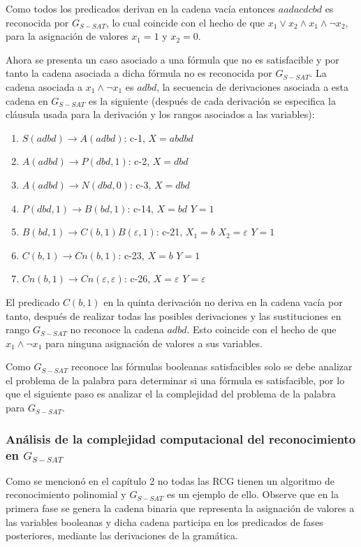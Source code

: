 \documentclass[12pt]{article}
\begin{document}
Como todos los predicados derivan en la cadena vacía entonces $aadacdcbd$ es reconocida por $G_{S-SAT}$, lo
cual coincide con el hecho de que $x_1 \vee  x_2 \wedge x_1 \wedge \neg x_2$, para la asignación de valores
$x_1=1$ y $x_2=0$.

Ahora se presenta un caso asociado a una fórmula que no es satisfacible y por tanto la cadena asociada a dicha
fórmula no es reconocida por $G_{S-SAT}$. La cadena asociada a $x_1  \wedge \neg x_1$ es $adbd$, la secuencia
de derivaciones asociada a esta cadena en $G_{S-SAT}$ es la siguiente  (después de
cada derivación se especifica la cláusula usada para la derivación y los rangos
asociados a las variables):

\begin{enumerate}
    \item $S(adbd)\to A(adbd)$: c-1, $X=abdbd$
    \item $A(adbd)\to P(dbd,1)$: c-2, $X=dbd$
    \item $A(adbd)\to N(dbd,0)$: c-3, $X=dbd$
    \item $P(dbd,1) \to B(bd,1)$: c-14, $X=bd$ $Y=1$
    \item $B(bd,1)\to C(b,1) B(\varepsilon,1)$: c-21, $X_1=b$ $X_2=\varepsilon$ $Y=1$
    \item $C(b,1)\to Cn(b,1)$: c-23, $X=b$ $Y=1$
    \item $Cn(b,1)\to Cn(\varepsilon,\varepsilon)$: c-26, $X=\varepsilon$ $Y=\varepsilon$
\end{enumerate}

El predicado $C(b,1)$ en la quinta derivación no deriva en la cadena vacía por tanto, después de realizar todas las
posibles derivaciones y las sustituciones en rango $G_{S-SAT}$ no reconoce la cadena $adbd$. Esto coincide con el hecho de
que $x_1  \wedge \neg x_1$ para ninguna asignación de valores a sus variables.

Como $G_{S-SAT}$ reconoce las fórmulas booleanas satisfacibles solo se debe analizar el problema de la palabra para determinar si una fórmula es satisfacible,
por lo que el siguiente paso es analizar el la complejidad del problema de la palabra para $G_{S-SAT}$.

\subsubsection{Análisis de la complejidad computacional del reconocimiento en $G_{S-SAT}$}

Como se mencionó en el capítulo 2 no todas las RCG tienen un algoritmo de reconocimiento polinomial y $G_{S-SAT}$
es un ejemplo de ello. Observe que en la primera fase se genera la cadena binaria que representa la asignación
de valores a las variables booleanas y dicha cadena participa en los predicados de fases posteriores, mediante
las derivaciones de la gramática.
\end{document}
